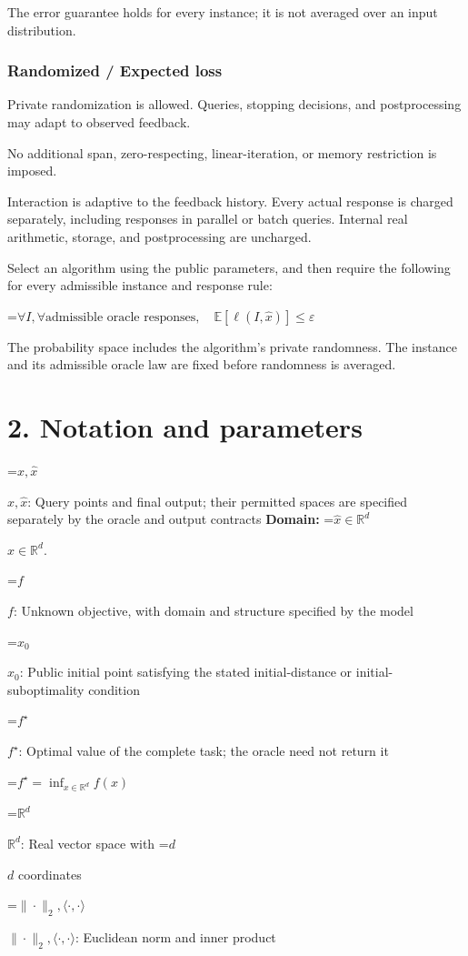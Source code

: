 \documentclass[10pt,a4paper]{article}
\newcommand{\AtlasMath}[1]{\par\begingroup\centering\setbox0=\hbox{$\displaystyle #1$}\ifdim\wd0>1.4\linewidth\typeout{ATLAS WIDE FORMULA: \the\wd0}\fi\ifdim\wd0>\linewidth\resizebox{\linewidth}{!}{\box0}\else\box0\fi\par\endgroup}
\newcommand{\AtlasInlineMath}[1]{\begingroup\setbox0=\hbox{$#1$}\ifdim\wd0>.4\linewidth\endgroup\AtlasMath{#1}\else\endgroup$#1$\fi}
\begin{document}
The error guarantee holds for every instance; it is not averaged over an input distribution.

\subsubsection{Randomized / Expected loss}
Private randomization is allowed. Queries, stopping decisions, and postprocessing may adapt to observed feedback.

No additional span, zero-respecting, linear-iteration, or memory restriction is imposed.

Interaction is adaptive to the feedback history. Every actual response is charged separately, including responses in parallel or batch queries. Internal real arithmetic, storage, and postprocessing are uncharged.

Select an algorithm using the public parameters, and then require the following for every admissible instance and response rule:


\AtlasMath{\forall I,\forall\text{admissible oracle responses},\quad\mathbb{E}[\ell(I,\widehat{x})]\le\varepsilon}


The probability space includes the algorithm's private randomness. The instance and its admissible oracle law are fixed before randomness is averaged.

\section{2. Notation and parameters}
\AtlasInlineMath{x,\widehat{x}}: Query points and final output; their permitted spaces are specified separately by the oracle and output contracts \textbf{Domain:} \AtlasInlineMath{\widehat{x}\in \mathbb{R}^d}.

\AtlasInlineMath{f}: Unknown objective, with domain and structure specified by the model

\AtlasInlineMath{x_0}: Public initial point satisfying the stated initial-distance or initial-suboptimality condition

\AtlasInlineMath{f^\star}: Optimal value of the complete task; the oracle need not return it


\AtlasMath{f^\star=\inf_{x\in \mathbb{R}^d}f(x)}


\AtlasInlineMath{\mathbb{R}^d}: Real vector space with \AtlasInlineMath{d} coordinates

\AtlasInlineMath{\|\cdot\|_2,\langle\cdot,\cdot\rangle}: Euclidean norm and inner product
\end{document}
